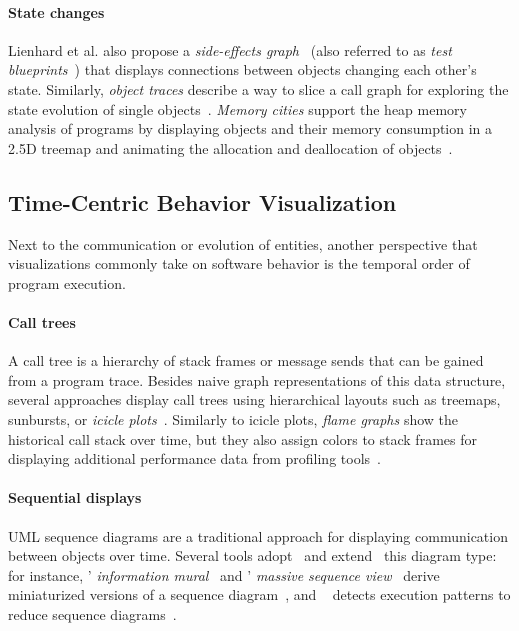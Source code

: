 \paragraph{State changes}

Lienhard et al. also propose a \emph{side-effects graph}~\cite{lienhard2009flow,fierz2009compass} (also referred to as \emph{test blueprints}~\cite{lienhard2008test}) that displays connections between objects changing each other's state.
Similarly, \emph{object traces} describe a way to slice a call graph for exploring the state evolution of single objects~\cite{thiede2023object}.
\emph{Memory cities} support the heap memory analysis of programs by displaying objects and their memory consumption in a 2.5D treemap and animating the allocation and deallocation of objects~\cite{weninger2020memory}.

\subsection{Time-Centric Behavior Visualization}

Next to the communication or evolution of entities, another perspective that visualizations commonly take on software behavior is the temporal order of program execution.

\paragraph{Call trees}

A call tree is a hierarchy of stack frames or message sends that can be gained from a program trace.
Besides naive graph representations of this data structure, several approaches display call trees using hierarchical layouts such as treemaps, sunbursts, or \emph{icicle plots}~\cite{kruskal1983icicle,trumper2012viewfusion,woodburn2019interactive}.
Similarly to icicle plots, \emph{flame graphs} show the historical call stack over time, but they also assign colors to stack frames for displaying additional performance data from profiling tools~\cite{gregg2016flame}.

\paragraph{Sequential displays}

UML sequence diagrams are a traditional approach for displaying communication between objects over time.
Several tools adopt~\cite{systä2001shimba} and extend~\cite{hamouLhadj2004survey} this diagram type: for instance, ' \emph{information mural}~\cite{jerding1998information} and ' \emph{massive sequence view}~\cite{cornelissen2009trace} derive miniaturized versions of a sequence diagram~\cite[sec. 3.4]{lemieux2006visualization}, and ~\cite{dePauw1998execution} detects execution patterns to reduce sequence diagrams~\cite{hamouLhadj2004survey}.
